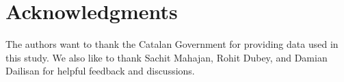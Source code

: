 





\section*{Acknowledgments}

The authors want to thank the Catalan Government for providing data used in this study. We also like to thank Sachit Mahajan, Rohit Dubey, and Damian Dailisan for helpful feedback and discussions.



